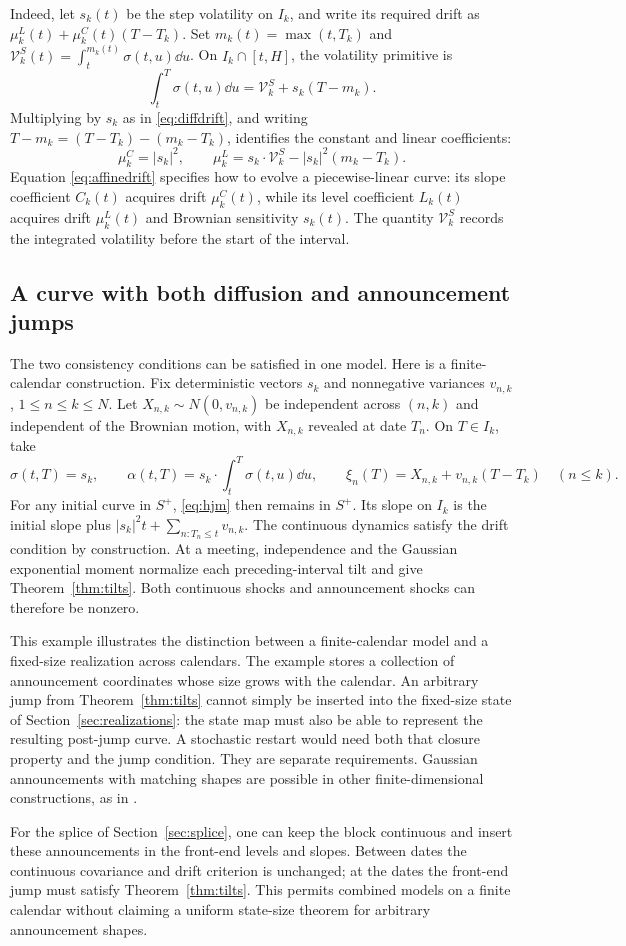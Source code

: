 Indeed, let $s_k(t)$ be the step volatility on $I_k$, and write its required drift as $\mu_k^L(t)+\mu_k^C(t)(T-T_k)$. Set $m_k(t)=\max(t,T_k)$ and $\mathcal V_k^S(t)=\int_t^{m_k(t)}\sigma(t,u)\dd u$. On $I_k\cap[t,H]$, the volatility primitive is
\[
\int_t^T\sigma(t,u)\dd u=\mathcal V_k^S+s_k(T-m_k).
\]
Multiplying by $s_k$ as in \eqref{eq:diffdrift}, and writing $T-m_k=(T-T_k)-(m_k-T_k)$, identifies the constant and linear coefficients:
\begin{equation}
\mu_k^C=|s_k|^2,\qquad \mu_k^L=s_k\cdot \mathcal V_k^S-|s_k|^2(m_k-T_k).\label{eq:affinedrift}
\end{equation}
Equation \eqref{eq:affinedrift} specifies how to evolve a piecewise-linear curve: its slope coefficient $C_k(t)$ acquires drift $\mu_k^C(t)$, while its level coefficient $L_k(t)$ acquires drift $\mu_k^L(t)$ and Brownian sensitivity $s_k(t)$. The quantity $\mathcal V_k^S$ records the integrated volatility before the start of the interval.

\subsection{A curve with both diffusion and announcement jumps}\label{sec:combined}
The two consistency conditions can be satisfied in one model. Here is a finite-calendar construction. Fix deterministic vectors $s_k$ and nonnegative variances $v_{n,k}$, $1\le n\le k\le N$. Let $X_{n,k}\sim N(0,v_{n,k})$ be independent across $(n,k)$ and independent of the Brownian motion, with $X_{n,k}$ revealed at date $T_n$. On $T\in I_k$, take
\[
\sigma(t,T)=s_k,\qquad
\alpha(t,T)=s_k\cdot\int_t^T\sigma(t,u)\dd u,
\qquad
\xi_n(T)=X_{n,k}+v_{n,k}(T-T_k)\quad(n\le k).
\]
For any initial curve in $S^+$, \eqref{eq:hjm} then remains in $S^+$. Its slope on $I_k$ is the initial slope plus $|s_k|^2t+\sum_{n:T_n\le t}v_{n,k}$. The continuous dynamics satisfy the drift condition by construction. At a meeting, independence and the Gaussian exponential moment normalize each preceding-interval tilt and give Theorem~\ref{thm:tilts}. Both continuous shocks and announcement shocks can therefore be nonzero.

This example illustrates the distinction between a finite-calendar model and a fixed-size realization across calendars. The example stores a collection of announcement coordinates whose size grows with the calendar. An arbitrary jump from Theorem~\ref{thm:tilts} cannot simply be inserted into the fixed-size state of Section~\ref{sec:realizations}: the state map must also be able to represent the resulting post-jump curve. A stochastic restart would need both that closure property and the jump condition. They are separate requirements. Gaussian announcements with matching shapes are possible in other finite-dimensional constructions, as in \citet[Example 3.10]{fontana2022term}.

For the splice of Section~\ref{sec:splice}, one can keep the block continuous and insert these announcements in the front-end levels and slopes. Between dates the continuous covariance and drift criterion is unchanged; at the dates the front-end jump must satisfy Theorem~\ref{thm:tilts}. This permits combined models on a finite calendar without claiming a uniform state-size theorem for arbitrary announcement shapes.

